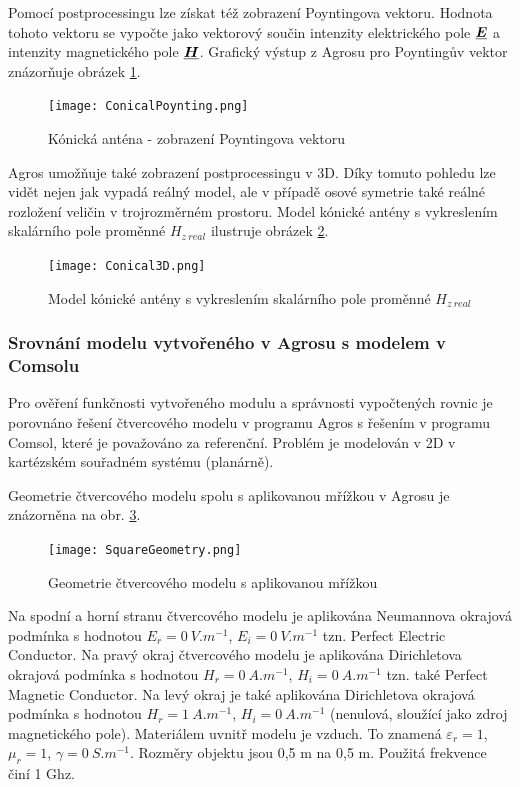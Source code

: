 \documentclass[12pt,a4paper,oneside]{article}
\numberwithin{equation}{section} %
\numberwithin{figure}{section} %
\numberwithin{table}{section} %
\renewcommand{\vec}[1]{\mbox{\boldmath$#1$}} %
\newcommand{\faz}[1]{{\underline{#1}}} %
\begin{document}
Pomocí postprocessingu lze získat též zobrazení Poyntingova vektoru. Hodnota tohoto vektoru se vypočte jako vektorový součin intenzity elektrického pole $\faz{\vec{E}}$ a intenzity magnetického pole $\faz{\vec{H}}$. Grafický výstup z Agrosu pro Poyntingův vektor znázorňuje obrázek \ref{Poynting}. 

\begin{figure}
\begin{center}
\texttt{[image: ConicalPoynting.png]} 
\caption{Kónická anténa - zobrazení Poyntingova vektoru} 
\label{Poynting}
\end{center}
\end{figure}

Agros umožňuje také zobrazení postprocessingu v 3D. Díky tomuto pohledu lze vidět nejen jak vypadá reálný model, ale v případě osové symetrie také reálné rozložení veličin v trojrozměrném prostoru. Model kónické antény s vykreslením skalárního pole proměnné $H _{z~real}$ ilustruje obrázek \ref{Con3D}.

\begin{figure}
\begin{center}
\texttt{[image: Conical3D.png]} 
\caption{Model kónické antény s vykreslením skalárního pole proměnné $H _{z~real}$} 
\label{Con3D}
\end{center}
\end{figure} 


\subsubsection{Srovnání modelu vytvořeného v Agrosu s modelem v Comsolu}
Pro ověření funkčnosti vytvořeného modulu a správnosti vypočtených rovnic je porovnáno řešení čtvercového modelu v programu Agros s řešením v programu Comsol, které je považováno za referenční. Problém je modelován v 2D v kartézském souřadném systému (planárně).

Geometrie čtvercového modelu spolu s aplikovanou mřížkou v Agrosu je znázorněna na obr. \ref{meshedSQ}. 

\begin{figure}
\begin{center}
\texttt{[image: SquareGeometry.png]} 
\caption{Geometrie čtvercového modelu s aplikovanou mřížkou} 
\label{meshedSQ}
\end{center}
\end{figure}

Na spodní a horní stranu čtvercového modelu je aplikována Neumannova okrajová podmínka s hodnotou $E_r = 0 ~ V.m^{-1}$, $E_i = 0 ~ V.m^{-1}$ tzn. Perfect Electric Conductor. Na pravý okraj čtvercového modelu je aplikována Dirichletova okrajová podmínka s hodnotou $H_r = 0 ~ A.m^{-1}$, $H_i = 0 ~ A.m^{-1}$ tzn. také Perfect Magnetic Conductor. Na levý okraj je také aplikována Dirichletova okrajová podmínka s hodnotou $H_r = 1 ~ A.m^{-1}$, $H_i = 0 ~ A.m^{-1}$ (nenulová, sloužící jako zdroj magnetického pole). Materiálem uvnitř modelu je vzduch. To znamená $\varepsilon _r = 1$, $\mu _r = 1$, $\gamma = 0 ~ S.m^{-1}$. Rozměry objektu jsou 0,5 m na 0,5 m. Použitá frekvence činí 1 Ghz. 
\end{document}
